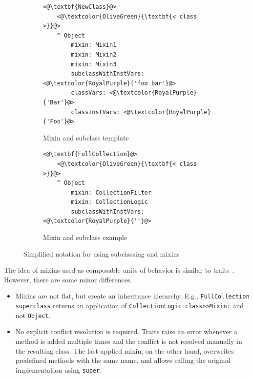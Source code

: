 \begin{figure}[!htp]
\begin{subfigure}[b]{0.45\textwidth}
\begin{lstlisting}
<@\textbf{NewClass}@>
    <@\textcolor{OliveGreen}{\textbf{< class >}}@>
    ^ Object
        mixin: Mixin1
        mixin: Mixin2
        mixin: Mixin3
        subclassWithInstVars: <@\textcolor{RoyalPurple}{'foo bar'}@>
        classVars: <@\textcolor{RoyalPurple}{'Bar'}@>
        classInstVars: <@\textcolor{RoyalPurple}{'Foo'}@>
\end{lstlisting}
\caption{Mixin and subclass template}
\end{subfigure}
\qquad
\begin{subfigure}[b]{0.45\textwidth}
\begin{lstlisting}
<@\textbf{FullCollection}@>
    <@\textcolor{OliveGreen}{\textbf{< class >}}@>
    ^ Object
        mixin: CollectionFilter
        mixin: CollectionLogic
        subclassWithInstVars: <@\textcolor{RoyalPurple}{''}@>
\end{lstlisting}
\caption{Mixin and subclass example}
\end{subfigure}
\caption{Simplified notation for using subclassing and mixins}
\label{fig:usecase_subcl_mixin}
\end{figure}

The idea of mixins used as composable units of behavior is similar to traits~\cite{traitsschaerli}. However, there are some minor differences.
\begin{itemize}
    \item Mixins are not flat, but create an inheritance hierarchy. E.g., \texttt{FullCollection superclass} returns an application of \texttt{CollectionLogic class>>Mixin:} and not \texttt{Object}.
    \item No explicit conflict resolution is required. Traits raise an error whenever a method is added multiple times and the conflict is not resolved manually in the resulting class. The last applied mixin, on the other hand, overwrites predefined methods with the same name, and allows calling the original implementation using \texttt{super}.
\end{itemize}


